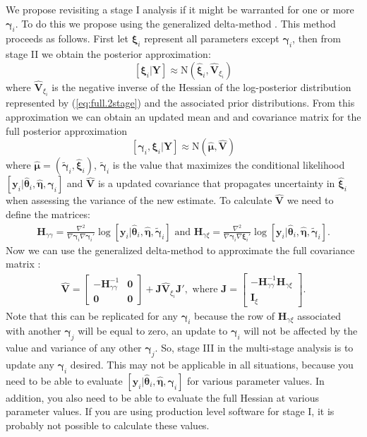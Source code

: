 \documentclass[12pt]{article}
\newcommand{\by}{\mathbf{y}}
\newcommand{\bt}{\boldsymbol{\theta}}
\newcommand{\bn}{\boldsymbol{\eta}}
\newcommand{\bg}{\boldsymbol{\gamma}}
\newcommand{\bm}{\boldsymbol{\mu}}
\newcommand{\bxi}{\boldsymbol{\xi}}
\newcommand{\bV}{\mathbf{V}}
\newcommand{\tN}{\text{N}}
\newcommand{\bY}{\mathbf{Y}}
\newcommand{\bz}{\mathbf{0}}
\begin{document}
We propose revisiting a stage I analysis if it might be warranted for one or more $\bg_i$. To do this we propose using the generalized delta-method \citep{kass1989approximate}. This method proceeds as follows. First let $\bxi_i$ represent all parameters except $\bg_i$, then from stage II we obtain the posterior approximation:
\[
[\bxi_i|\bY] \approx \tN(\hat{\bxi}_i, \widehat{\bV}_{\xi_i})
\]  
where $\widehat{\bV}_{\xi_i}$ is the negative inverse of the Hessian of the log-posterior distribution represented by (\ref{eq:full.2stage}) and the associated prior distributions. From this approximation we can obtain an updated mean and and covariance matrix for the full posterior approximation
\[
[\bg_i ,\bxi_i|\bY] \approx \tN(\hat{\bm}, \widehat{\bV})
\]
where $\hat{\bm} = (\tilde{\bg}_i,\hat{\bxi}_i)$, $\tilde{\bg}_i$ is the value that maximizes the conditional likelihood $[\by_i|\hat{\bt}_i, \hat{\bn}, \bg_i]$ and $\widehat{\bV}$ is a updated covariance that propagates uncertainty in $\hat{\bxi}_i$ when assessing the variance of the new estimate. To calculate $\widehat{\bV}$ we need to define the matrices: 
\[
\begin{gathered}
\mathbf{H}_{\gamma\gamma} = \frac{\nabla^2}{\nabla \bg_i \nabla \bg_i'} \log[\by_i|\hat{\bt}_i, \hat{\bn}, \tilde{\bg}_i] 
\text{ and }
\mathbf{H}_{\gamma\xi} = \frac{\nabla^2}{\nabla \bg_i \nabla \bxi_i'} \log[\by_i|\hat{\bt}_i, \hat{\bn}, \tilde{\bg}_i].
\end{gathered}
\] 
Now we can use the generalized delta-method to approximate the full covariance matrix \citep{kass1989approximate, skaug2006automatic}:
\[
\begin{gathered}
\widehat{\bV} = \left[\begin{array}{cc} -\mathbf{H}_{\gamma\gamma}^{-1} & \bz \\ \bz & \bz \end{array}\right] + 
\mathbf{J} \widehat{\bV}_{\xi_i} \mathbf{J}',  \text{ where } 
\mathbf{J} = \left[ \begin{array}{c} -\mathbf{H}_{\gamma\gamma}^{-1}\mathbf{H}_{\gamma\xi} \\ \mathbf{I}_{\xi} \end{array}\right].
\end{gathered}
\]
Note that this can be replicated for any $\bg_i$ because the row of $\mathbf{H}_{\gamma\xi}$ associated with another $\bg_j$ will be equal to zero, an update to $\bg_i$ will not be affected by the value and variance of any other $\hat{\bg}_j$. So, stage III in the multi-stage analysis is to update any $\bg_i$ desired. This may not be applicable in all situations, because you need to be able to evaluate $[\by_i|\hat{\bt}_i, \hat{\bn}, \bg_i]$ for various parameter values. In addition, you also need to be able to evaluate the full Hessian at various parameter values. If you are using production level software for stage I, it is probably not possible to calculate these values. 
\end{document}
